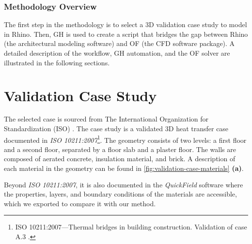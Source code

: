 \subsubsection{Methodology Overview}
The first step in the methodology is to select a 3D validation case study to model in Rhino. 
Then, \gls{GH}  is used to create a script that bridges the gap between Rhino (the architectural modeling software) and  \gls{OF} (the CFD software package). A detailed description of the workflow, \gls{GH} automation, and the \gls{OF} solver are illustrated in the following sections.





\section{Validation Case Study}
The selected case is sourced from The International Organization for Standardization (ISO) \cite{ISO}. The case study is a validated 3D heat transfer case documented in \textit{ISO 10211:2007}\footnote{ISO 10211:2007---Thermal bridges in building construction. Validation of case A.3 \cite{ISO}.}. 
The geometry consists of two levels: a first floor and a second floor, separated by a floor slab and a plaster floor. The walls are composed of aerated concrete, insulation material, and brick.
A description of each material in the geometry can be found in \ref{fig:validation-case-materials} \textbf{(a)}.

Beyond \textit{ISO 10211:2007}, it is also documented in the \textit{QuickField} software where the properties, layers, and boundary conditions of the materials are accessible, which we exported to compare it with our method. 

   


